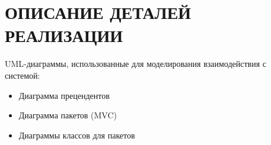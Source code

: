\section[Описание деталей реализации]{ОПИСАНИЕ ДЕТАЛЕЙ РЕАЛИЗАЦИИ}

UML-диаграммы, использованные для моделирования взаимодействия с системой:
\begin{itemize}

\item Диаграмма прецендентов

\item Диаграмма пакетов (MVC)

\item Диаграммы классов для пакетов

\end{itemize}


